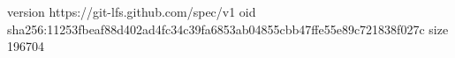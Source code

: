 version https://git-lfs.github.com/spec/v1
oid sha256:11253fbeaf88d402ad4fc34c39fa6853ab04855cbb47ffe55e89c721838f027c
size 196704
